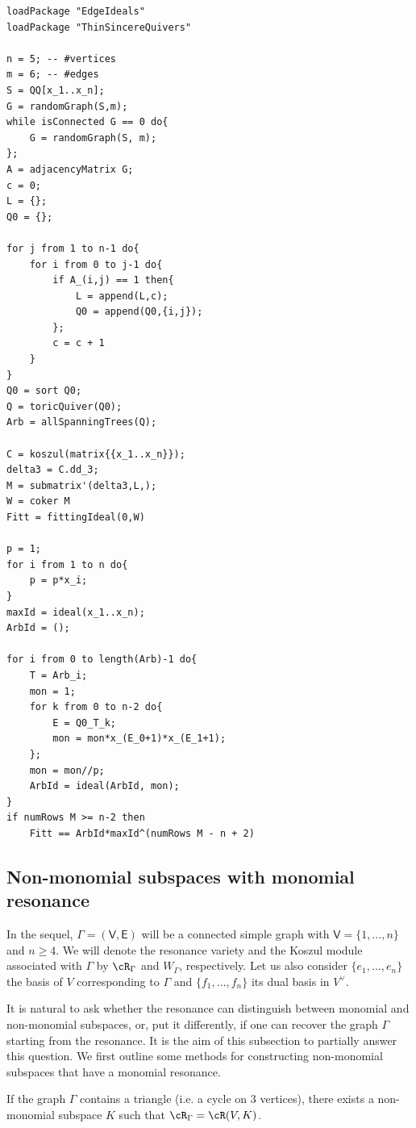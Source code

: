 \documentclass[10pt, leqno]{amsart}
\begin{document}
\begin{lstlisting}[caption={A \emph{Macaulay2} script for Conjecture~\ref{conj_fitt_ideal}}]
loadPackage "EdgeIdeals"
loadPackage "ThinSincereQuivers"

n = 5; -- #vertices
m = 6; -- #edges
S = QQ[x_1..x_n];
G = randomGraph(S,m);
while isConnected G == 0 do{
    G = randomGraph(S, m);
};
A = adjacencyMatrix G;
c = 0;
L = {};
Q0 = {};

for j from 1 to n-1 do{
    for i from 0 to j-1 do{
        if A_(i,j) == 1 then{
            L = append(L,c);
            Q0 = append(Q0,{i,j});
        };
        c = c + 1
    }
}
Q0 = sort Q0;
Q = toricQuiver(Q0);
Arb = allSpanningTrees(Q);

C = koszul(matrix{{x_1..x_n}});
delta3 = C.dd_3;
M = submatrix'(delta3,L,);
W = coker M
Fitt = fittingIdeal(0,W)

p = 1;
for i from 1 to n do{
    p = p*x_i;
}
maxId = ideal(x_1..x_n);
ArbId = ();

for i from 0 to length(Arb)-1 do{
    T = Arb_i;
    mon = 1;
    for k from 0 to n-2 do{
        E = Q0_T_k;
        mon = mon*x_(E_0+1)*x_(E_1+1);
    };
    mon = mon//p;
    ArbId = ideal(ArbId, mon);
}
if numRows M >= n-2 then 
    Fitt == ArbId*maxId^(numRows M - n + 2)
\end{lstlisting}


\subsection{Non-monomial subspaces with monomial resonance}

In the sequel, $\Gamma = (\mathsf{V}, \mathsf{E})$ will be a connected simple graph with $\mathsf{V} = \{1, \ldots, n\}$ and $n \ge 4$. We will denote the resonance variety and the Koszul module associated with $\Gamma$ by $\cR_\Gamma$ and $W_\Gamma$, respectively. Let us also consider $\{e_1, \ldots, e_n \}$ the basis of $V$ corresponding to $\Gamma$ and $\{f_1, \ldots, f_n \}$ its dual basis in $V^\vee$.

It is natural to ask whether the resonance can distinguish between monomial and non-monomial subspaces, or, put it differently, if one can recover the graph $\Gamma$ starting from the resonance. It is the aim of this subsection to partially answer this question. We first outline some methods for constructing non-monomial subspaces that have a monomial resonance.

\begin{prop} \label{prop_triangle}
If the graph $\Gamma$ contains a triangle (i.e. a cycle on $3$ vertices), there exists a non-monomial subspace $K$ such that $\cR_\Gamma = \cR(V,K)$.
\end{prop}
\end{document}
